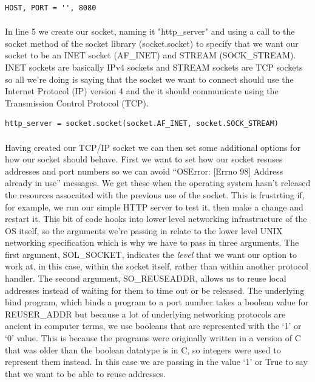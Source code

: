 \begin{lstlisting}[style=CODE]
HOST, PORT = '', 8080
\end{lstlisting}

\paragraph{} In line 5 we create our socket, naming it "http\_server" and using a call to the socket method of the socket library (socket.socket) to specify that we want our socket to be an INET socket (AF\_INET) and STREAM (SOCK\_STREAM). INET sockets are basically IPv4 sockets and STREAM sockets are TCP sockets so all we're doing is saying that the socket we want to connect should use the Internet Protocol (IP) version 4 and the it should communicate using the Transmission Control Protocol (TCP).

\begin{lstlisting}[style=CODE]
http_server = socket.socket(socket.AF_INET, socket.SOCK_STREAM)
\end{lstlisting}

\paragraph{} Having created our TCP/IP socket we can then set some additional options for how our socket should behave. First we want to set how our socket resuses addresses and port numbers so we can avoid ``OSError: [Errno 98] Address already in use'' messages. We get these when the operating system hasn't released the resources assocaited with the previous use of the socket. This is frustrting if, for example, we run our simple HTTP server to test it, then make a change and restart it. This bit of code hooks into lower level networking infrastructure of the OS itself, so the arguments we're passing in relate to the lower level UNIX networking specification which is why we have to pass in three arguments. The first argument, SOL\_SOCKET, indicates the \emph{level} that we want our option to work at, in this case, within the socket itself, rather than within another protocol handler. The second argument, SO\_REUSEADDR, allows us to reuse local addresses instead of waiting for them to time out or be released. The underlying bind program, which binds a program to a port number takes a boolean value for REUSER\_ADDR but because a lot of underlying networking protocols are ancient in computer terms, we use booleans that are represented with the `1' or `0' value. This is because the programs were originally written in a version of C that was older than the boolean datatype is in C, so integers were used to represent them instead. In this case we are passing in the value `1' or True to say that we want to be able to reuse addresses.

